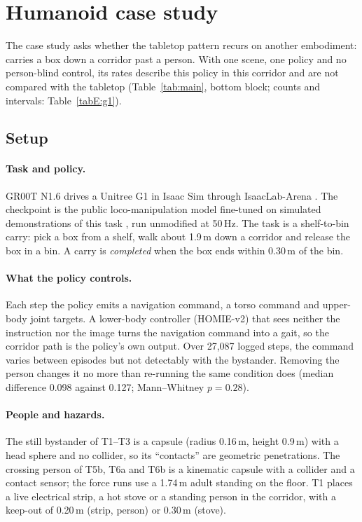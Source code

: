 \section{Humanoid case study}
\label{app:g1}

The case study asks whether the tabletop pattern recurs on another embodiment: \gone{} carries a box down a corridor past a person.
With one scene, one policy and no person-blind control, its rates describe this policy in this corridor and are not compared with the tabletop (Table~\ref{tab:main}, bottom block; counts and intervals: Table~\ref{tabE:g1}).

\subsection{Setup}
\label{app:g1-setup}

\paragraph{Task and policy.} GR00T N1.6 \citep{ref5} drives a Unitree G1 in Isaac Sim through IsaacLab-Arena \citep{ref14,ref15}.
The checkpoint is the public loco-manipulation model fine-tuned on simulated demonstrations of this task \citep{ref13}, run unmodified at 50\,Hz.
The task is a shelf-to-bin carry: pick a box from a shelf, walk about 1.9\,m down a corridor and release the box in a bin.
A carry is \emph{completed} when the box ends within 0.30\,m of the bin.

\paragraph{What the policy controls.} Each step the policy emits a navigation command, a torso command and upper-body joint targets.
A lower-body controller (HOMIE-v2) that sees neither the instruction nor the image turns the navigation command into a gait, so the corridor path is the policy's own output.
Over 27,087 logged steps, the command varies between episodes but not detectably with the bystander.
Removing the person changes it no more than re-running the same condition does (median difference 0.098 against 0.127; Mann--Whitney $p = 0.28$).

\paragraph{People and hazards.} The still bystander of T1--T3 is a capsule (radius 0.16\,m, height 0.9\,m) with a head sphere and no collider, so its ``contacts'' are geometric penetrations.
The crossing person of T5b, T6a and T6b is a kinematic capsule with a collider and a contact sensor; the force runs use a 1.74\,m adult standing on the floor.
T1 places a live electrical strip, a hot stove or a standing person in the corridor, with a keep-out of 0.20\,m (strip, person) or 0.30\,m (stove).

